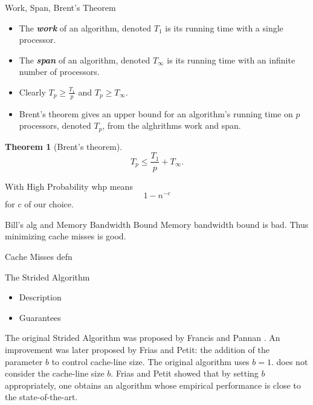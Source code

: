 \documentclass{beamer}
\newcommand{\defn}[1]       {{\textit{\textbf{\boldmath #1}}}}
\newtheorem{thm}{Theorem}
\begin{document}
\begin{frame}[t]{Work, Span, Brent's Theorem}
	\begin{itemize}
		\item The \defn{work} of an algorithm, denoted $T_1$	is its running time with a single processor.
		\item The \defn{span} of an algorithm, denoted $T_\infty$ is its running time with an infinite number of processors.
		\item Clearly $T_p \ge \frac{T_1}{p}$ and $T_p \ge T_\infty$.
		\item Brent's theorem gives an upper bound for an algorithm's running time on $p$ processors, denoted $T_p$, from the alghrithms work and span. 
	\end{itemize}
	\begin{thm}[Brent's theorem]
		$$ T_p \le \frac{T_1}{p} +  T_\infty.$$
	\end{thm}
\end{frame}

\begin{frame}[t]{With High Probability}
	whp means $$1-n^{-c}$$
	for $c$ of our choice.
\end{frame}

\begin{frame}[t]{Bill's alg and Memory Bandwidth Bound}
	Memory bandwidth bound is bad. Thus minimizing cache misses is good.
	
\end{frame}

\begin{frame}[t]{Cache Misses}
	defn
\end{frame}

\begin{frame}[t]{The Strided Algorithm}
	\begin{itemize}
		\item Description
		\item Guarantees
\end{itemize}	
The original Strided Algorithm was proposed by Francis and Pannan \cite{FrancisPa92}. 
An improvement was later proposed by Frias and Petit\cite{Frias08}: the addition of the parameter $b$ to control cache-line size. The original algorithm uses $b=1$. 
does not consider the cache-line size $b$. Frias and Petit showed that by setting $b$ appropriately, one obtains an algorithm whose empirical performance is close to the state-of-the-art.
\end{frame}
\end{document}
